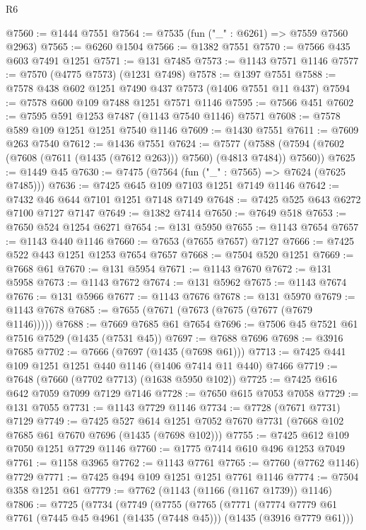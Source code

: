 \begin{lexlean}{R6}
\begin{coremodule}
@7560 := @1444 @7551
@7564 := @7535 (fun ("_" : @6261) => @7559 @7560 @2963)
@7565 := @6260 @1504
@7566 := @1382 @7551
@7570 := @7566 @435 @603 @7491 @1251
@7571 := @131 @7485
@7573 := @1143 @7571 @1146
@7577 := @7570 (@4775 @7573) (@1231 @7498)
@7578 := @1397 @7551
@7588 := @7578 @438 @602 @1251 @7490 @437 @7573 (@1406 @7551 @11 @437)
@7594 := @7578 @600 @109 @7488 @1251 @7571 @1146
@7595 := @7566 @451
@7602 := @7595 @591 @1253 @7487 (@1143 @7540 @1146) @7571
@7608 := @7578 @589 @109 @1251 @1251 @7540 @1146
@7609 := @1430 @7551
@7611 := @7609 @263 @7540
@7612 := @1436 @7551
@7624 := @7577
    (@7588 (@7594 (@7602 (@7608 (@7611 (@1435 (@7612 @263))) @7560) (@4813 @7484)) @7560))
@7625 := @1449 @45
@7630 := @7475 (@7564 (fun ("_" : @7565) => @7624 (@7625 @7485)))
@7636 := @7425 @645 @109 @7103 @1251 @7149 @1146
@7642 := @7432 @46 @644 @7101 @1251 @7148 @7149
@7648 := @7425 @525 @643 @6272 @7100 @7127 @7147
@7649 := @1382 @7414
@7650 := @7649 @518
@7653 := @7650 @524 @1254 @6271
@7654 := @131 @5950
@7655 := @1143 @7654
@7657 := @1143 @440 @1146
@7660 := @7653 (@7655 @7657) @7127
@7666 := @7425 @522 @443 @1251 @1253 @7654 @7657
@7668 := @7504 @520 @1251
@7669 := @7668 @61
@7670 := @131 @5954
@7671 := @1143 @7670
@7672 := @131 @5958
@7673 := @1143 @7672
@7674 := @131 @5962
@7675 := @1143 @7674
@7676 := @131 @5966
@7677 := @1143 @7676
@7678 := @131 @5970
@7679 := @1143 @7678
@7685 := @7655 (@7671 (@7673 (@7675 (@7677 (@7679 @1146)))))
@7688 := @7669 @7685 @61 @7654
@7696 := @7506 @45 @7521 @61 @7516 @7529 (@1435 (@7531 @45))
@7697 := @7688 @7696
@7698 := @3916 @7685
@7702 := @7666 (@7697 (@1435 (@7698 @61)))
@7713 := @7425 @441 @109 @1251 @1251 @440 @1146 (@1406 @7414 @11 @440) @7466
@7719 := @7648 (@7660 (@7702 @7713) (@1638 @5950 @102))
@7725 := @7425 @616 @642 @7059 @7099 @7129 @7146
@7728 := @7650 @615 @7053 @7058
@7729 := @131 @7055
@7731 := @1143 @7729 @1146
@7734 := @7728 (@7671 @7731) @7129
@7749 := @7425
    @527
    @614
    @1251
    @7052
    @7670
    @7731
    (@7668 @102 @7685 @61 @7670 @7696 (@1435 (@7698 @102)))
@7755 := @7425 @612 @109 @7050 @1251 @7729 @1146
@7760 := @1775 @7414 @610 @496 @1253 @7049
@7761 := @1158 @3965
@7762 := @1143 @7761
@7765 := @7760 (@7762 @1146) @7729
@7771 := @7425 @494 @109 @1251 @1251 @7761 @1146
@7774 := @7504 @358 @1251 @61
@7779 := @7762 (@1143 (@1166 (@1167 @1739)) @1146)
@7806 := @7725
    (@7734
      (@7749
        (@7755
          (@7765
            (@7771
              (@7774
                @7779
                @61
                @7761
                (@7445 @45 @4961 (@1435 (@7448 @45)))
                (@1435 (@3916 @7779 @61)))

\end{coremodule}
\end{lexlean}
